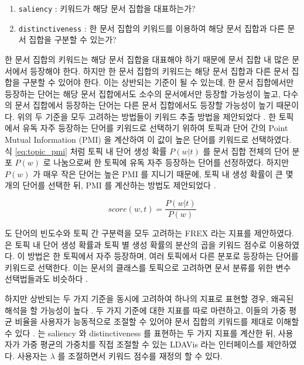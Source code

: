 \documentclass[oneside, ko,phd]{snuthesis_utf8_kor}
\begin{document}
\begin{enumerate}
  \item \texttt{saliency} : 키워드가 해당 문서 집합을 대표하는가?
  \item \texttt{distinctiveness} : 한 문서 집합의 키워드를 이용하여 해당 문서 집합과 다른 문서 집합을 구분할 수 있는가?
\end{enumerate}

한 문서 집합의 키워드는 해당 문서 집합을 대표해야 하기 때문에 문서 집합 내 많은 문서에서 등장해야 한다.
하지만 한 문서 집합의 키워드는 해당 문서 집합과 다른 문서 집합을 구분할 수 있어야 한다.
이는 상반되는 기준이 될 수 있는데, 한 문서 집합에서만 등장하는 단어는 해당 문서 집합에서도 소수의 문서에서만 등장할 가능성이 높고, 다수의 문서 집합에서 등장하는 단어는 다른 문서 집합에서도 등장할 가능성이 높기 때문이다.
위의 두 기준을 모두 고려하는 방법들이 키워드 추출 방법을 제안되었다 \cite{bischof2012summarizing, newman2010evaluating, taddy2012estimation}.
한 토픽에서 유독 자주 등장하는 단어를 키워드로 선택하기 위하여 \cite{newman2010evaluating, taddy2012estimation, mimno2011optimizing} 토픽과 단어 간의 Point Mutual Information (PMI) 을 계산하여 이 값이 높은 단어를 키워드로 선택하였다.
식 \ref{eq:topic_pmi} 처럼 토픽 내 단어 생성 확률 $P(w \vert t)$ 를 문서 집합 전체의 단어 분포 $P(w)$ 로 나눔으로써 한 토픽에 유독 자주 등장하는 단어를 선정하였다.
하지만 $P(w)$ 가 매우 작은 단어는 높은 PMI 를 지니기 때문에, 토픽 내 생성 확률이 큰 몇 개의 단어를 선택한 뒤, PMI 를 계산하는 방법도 제안되었다 \cite{newman2010evaluating, alsumait2009topic}.

\begin{equation}
  \label{eq:topic_pmi}
  score(w,t) = \frac{P(w \vert t)}{P(w)}
\end{equation}

\cite{bischof2012summarizing} 도 단어의 빈도수와 토픽 간 구분력을 모두 고려하는 FREX 라는 지표를 제안하였다.
\cite{song2009topic} 은 토픽 내 단어 생성 확률과 토픽 별 생성 확률의 분산의 곱을 키워드 점수로 이용하였다.
이 방법은 한 토픽에서 자주 등장하며, 여러 토픽에서 다른 분포로 등장하는 단어를 키워드로 선택한다.
이는 문서의 클래스를 토픽으로 고려하면 문서 분류를 위한 변수 선택법들과도 비슷하다 \cite{largeron2011entropy, popescul2000automatic}.

하지만 상반되는 두 가지 기준을 동시에 고려하여 하나의 지표로 표현할 경우, 왜곡된 해석을 할 가능성이 높다 \cite{chuang2012interpretation}. 
두 가지 기준에 대한 지표를 따로 마련하고, 이들의 가중 평균 비율을 사용자가 능동적으로 조절할 수 있어야 문서 집합의 키워드를 제대로 이해할 수 있다 \cite{chuang2012interpretation}.
\cite{sievert2014ldavis}는 saliency 와 distinctiveness 를 표현하는 두 가지 지표를 계산한 뒤, 사용자가 가중 평균의 가중치를 직접 조절할 수 있는 LDAVis 라는 인터페이스를 제안하였다.
사용자는 $\lambda$ 를 조절하면서 키워드 점수를 재정의 할 수 있다.
\end{document}
